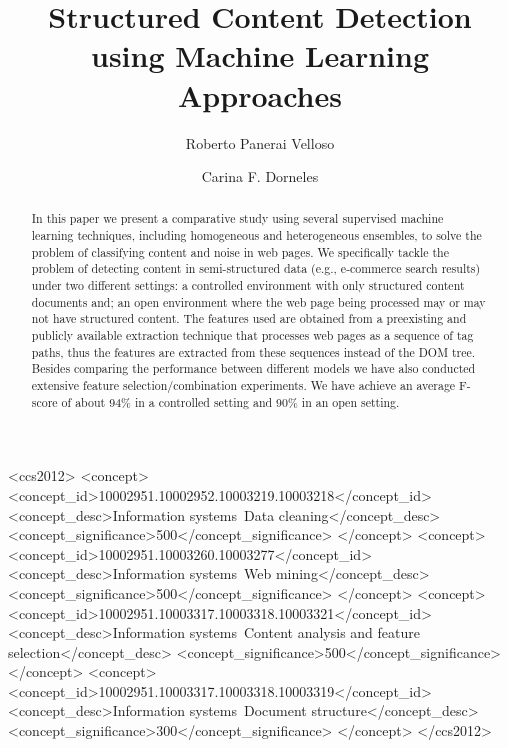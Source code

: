 \documentclass[sigconf,10pt]{acmart}
\begin{document}
\acmDOI{}\acmISBN{}

\fancyhead{}

\title{Structured Content Detection using Machine Learning Approaches}

\author{Roberto Panerai Velloso}

\author{Carina F. Dorneles}

\begin{abstract}
    In this paper we present a comparative study using several supervised 
    machine learning techniques, including homogeneous and heterogeneous
    ensembles, to solve the problem of classifying content and noise in web
    pages. We specifically tackle the problem of detecting content in 
    semi-structured data (e.g., e-commerce 
    search results) under two different
    settings: a controlled environment with only structured content documents
    and; an open environment where the web page being processed may or may
    not have structured content.
    The features used are obtained from a preexisting and publicly available extraction 
    technique that processes web pages as a sequence of tag paths, thus 
    the features are extracted from these sequences instead of the DOM 
    tree. Besides comparing the performance between different models 
    we have also conducted extensive feature selection/combination 
    experiments. We have achieve an average F-score of about
    94\% in a controlled setting and 90\% in an open setting.
\end{abstract}

%
%
\begin{CCSXML}
<ccs2012>
<concept>
<concept_id>10002951.10002952.10003219.10003218</concept_id>
<concept_desc>Information systems~Data cleaning</concept_desc>
<concept_significance>500</concept_significance>
</concept>
<concept>
<concept_id>10002951.10003260.10003277</concept_id>
<concept_desc>Information systems~Web mining</concept_desc>
<concept_significance>500</concept_significance>
</concept>
<concept>
<concept_id>10002951.10003317.10003318.10003321</concept_id>
<concept_desc>Information systems~Content analysis and feature selection</concept_desc>
<concept_significance>500</concept_significance>
</concept>
<concept>
<concept_id>10002951.10003317.10003318.10003319</concept_id>
<concept_desc>Information systems~Document structure</concept_desc>
<concept_significance>300</concept_significance>
</concept>
</ccs2012>
\end{CCSXML}
\end{document}
